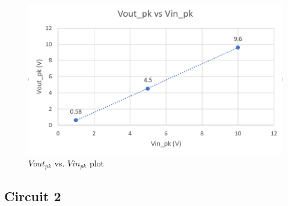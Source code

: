 \documentclass{article}
\begin{document}
\begin{figure}[H]
  \centering
  \includegraphics[width=\textwidth]{image/Part1/plot.png}
  \caption{$Vout_{pk}$ vs. $Vin_{pk}$ plot}
\end{figure}

\subsection*{Circuit 2}
\end{document}
